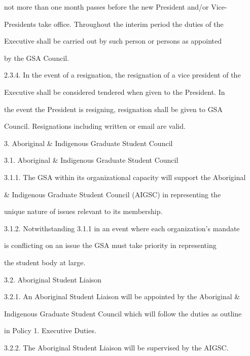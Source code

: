         not more than one month passes before the new President and/or Vice- 

        Presidents take office. Throughout the interim period the duties of the  

        Executive shall be carried out by such person or persons as appointed  

        by the GSA Council.  



2.3.4. In the event of a resignation, the resignation of a vice president of the  

        Executive shall be considered tendered when given to the President. In  

        the event the President is resigning, resignation shall be given to GSA  

        Council. Resignations including written or email are valid.  



3.  Aboriginal & Indigenous Graduate Student Council  



3.1.        Aboriginal & Indigenous Graduate Student Council  



3.1.1. The GSA within its organizational capacity will support the Aboriginal  

        & Indigenous Graduate Student Council (AIGSC) in representing the  

        unique nature of issues relevant to its membership.  



3.1.2. Notwithstanding 3.1.1 in an event where each organization’s mandate  

        is conflicting on an issue the GSA must take priority in representing  

        the student body at large.  



3.2.        Aboriginal Student Liaison  



3.2.1. An Aboriginal Student Liaison will be appointed by the Aboriginal &  

Indigenous Graduate Student Council which will follow the duties as outline  

in Policy 1. Executive Duties.   



3.2.2.  The  Aboriginal  Student  Liaison  will  be  supervised  by  the  AIGSC.  

